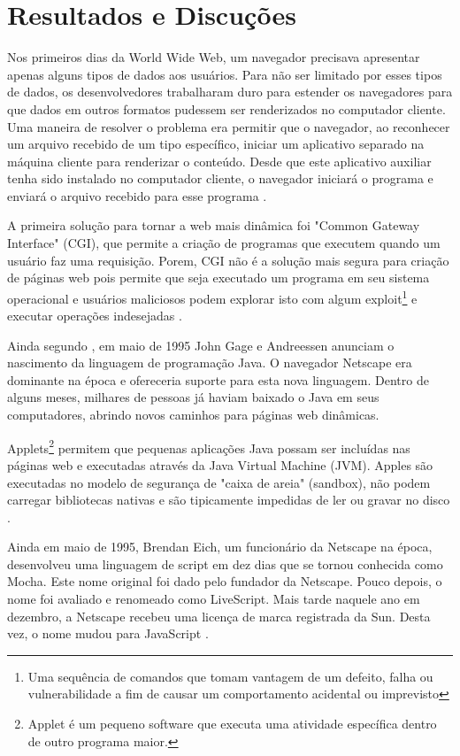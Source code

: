 \section{Resultados e Discuções}



Nos primeiros dias da World Wide Web, um navegador precisava apresentar apenas alguns tipos de dados aos usuários. Para não ser limitado por esses tipos de dados, os desenvolvedores trabalharam duro para estender os navegadores para que dados em outros formatos pudessem ser renderizados no computador cliente. Uma maneira de resolver o problema era permitir que o navegador, ao reconhecer um arquivo recebido de um tipo específico, iniciar um aplicativo separado na máquina cliente para renderizar o conteúdo. Desde que este aplicativo auxiliar tenha sido instalado no computador cliente, o navegador iniciará o programa e enviará o arquivo recebido para esse programa \citep{zammetti2007brief}.

A primeira solução para tornar a web mais dinâmica foi "Common Gateway Interface" (CGI), que permite a criação de programas que executem quando um usuário faz uma requisição. Porem, CGI não é a solução mais segura para criação de páginas web pois permite que seja executado um programa em seu sistema operacional e usuários maliciosos podem explorar isto com algum exploit\footnote{Uma sequência de comandos que tomam vantagem de um defeito, falha ou vulnerabilidade a fim de causar um comportamento acidental ou imprevisto} e executar operações indesejadas \citep{Asleson2006}.

Ainda segundo \citet{Asleson2006}, em maio de 1995 John Gage e Andreessen anunciam o nascimento da linguagem de programação Java. O navegador Netscape era dominante na época e ofereceria suporte para esta nova linguagem. Dentro de alguns meses, milhares de pessoas já haviam baixado o Java em seus computadores, abrindo novos caminhos para páginas web dinâmicas.

Applets\footnote{Applet é um pequeno software que executa uma atividade específica dentro de outro programa maior.} permitem que pequenas aplicações Java possam ser incluídas nas páginas web e executadas através da Java Virtual Machine (JVM). Apples são executadas no modelo de segurança de "caixa de areia" (sandbox), não podem carregar bibliotecas nativas e são tipicamente impedidas de ler ou gravar no disco \citep{Asleson2006}.

Ainda em maio de 1995, Brendan Eich, um funcionário da Netscape na época, desenvolveu uma linguagem de script em dez dias que se tornou conhecida como Mocha. Este nome original foi dado pelo fundador da Netscape. Pouco depois, o nome foi avaliado e renomeado como LiveScript. Mais tarde naquele ano em dezembro, a Netscape recebeu uma licença de marca registrada da Sun. Desta vez, o nome mudou para JavaScript \citep{neer2013history}.



